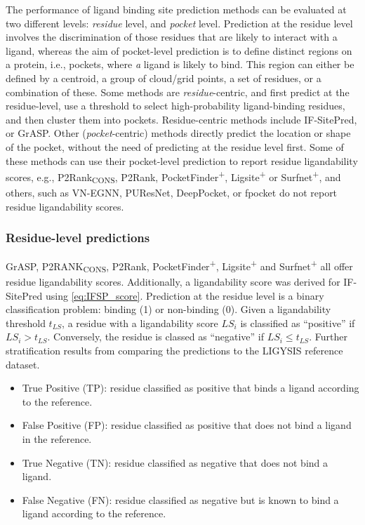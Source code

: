 The performance of ligand binding site prediction methods can be evaluated at two different levels: \textit{residue} level, and \textit{pocket} level. Prediction at the residue level involves the discrimination of those residues that are likely to interact with a ligand, whereas the aim of pocket-level prediction is to define distinct regions on a protein, i.e., pockets, where \textit{a} ligand is likely to bind. This region can either be defined by a centroid, a group of cloud/grid points, a set of residues, or a combination of these. Some methods are \textit{residue}-centric, and first predict at the residue-level, use a threshold to select high-probability ligand-binding residues, and then cluster them into pockets. Residue-centric methods include IF-SitePred, or GrASP. Other (\textit{pocket}-centric) methods directly predict the location or shape of the pocket, without the need of predicting at the residue level first. Some of these methods can use their pocket-level prediction to report residue ligandability scores, e.g., P2Rank\textsubscript{CONS}, P2Rank, PocketFinder\textsuperscript{+}, Ligsite\textsuperscript{+} or Surfnet\textsuperscript{+}, and others, such as VN-EGNN, PUResNet, DeepPocket, or fpocket do not report residue ligandability scores.

\subsubsection{Residue-level predictions}

GrASP, P2RANK\textsubscript{CONS}, P2Rank, PocketFinder\textsuperscript{+}, Ligsite\textsuperscript{+} and Surfnet\textsuperscript{+} all offer residue ligandability scores. Additionally, a ligandability score was derived for IF-SitePred using \autoref{eq:IFSP_score}. Prediction at the residue level is a binary classification problem: binding (1) or non-binding (0). Given a ligandability threshold $t_{LS}$, a residue with a ligandability score $LS_{i}$ is classified as ``positive'' if $LS_{i} > t_{LS}$. Conversely, the residue is classed as ``negative'' if $LS_{i} \leq t_{LS}$. Further stratification results from comparing the predictions to the LIGYSIS reference dataset.

\begin{itemize}
\item True Positive (TP): residue classified as positive that binds a ligand according to the reference.
\item False Positive (FP): residue classified as positive that does not bind a ligand in the reference.
\item True Negative (TN): residue classified as negative that does not bind a ligand.
\item False Negative (FN): residue classified as negative but is known to bind a ligand according to the reference.
\end{itemize}


